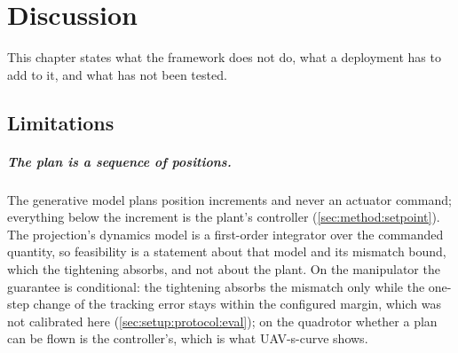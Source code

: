 
\chapter{Discussion}\label{ch:discussion}

This chapter states what the framework does not do, what a deployment has to add to it, and what has
not been tested.

\section{Limitations}\label{sec:disc:limitations}

\paragraph{The plan is a sequence of positions.} The generative model plans position increments and
never an actuator command; everything below the increment is the plant's controller
(\autoref{sec:method:setpoint}). The projection's dynamics model is a first-order integrator over the
commanded quantity, so feasibility is a statement about that model and its mismatch bound, which the
tightening absorbs, and not about the plant. On the manipulator the guarantee is conditional: the tightening
absorbs the mismatch only while the one-step change of the tracking error stays within the configured margin,
which was not calibrated here (\autoref{sec:setup:protocol:eval}); on the quadrotor whether a plan can be flown is the
controller's, which is what UAV-s-curve shows.

